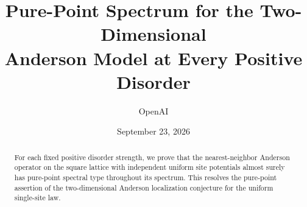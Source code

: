 \documentclass[11pt]{article}
\title{Pure-Point Spectrum for the Two-Dimensional\\Anderson Model at Every Positive Disorder}
\author{OpenAI}
\date{September 23, 2026}
\numberwithin{equation}{section}
\theoremstyle{definition}
\theoremstyle{remark}
\begin{document}
\maketitle
\begin{abstract}
For each fixed positive disorder strength, we prove that the nearest-neighbor
Anderson operator on the square lattice with independent uniform site
potentials almost surely has pure-point spectral type throughout its spectrum.
This resolves the pure-point assertion of the two-dimensional Anderson
localization conjecture for the uniform single-site law.
\end{abstract}












\end{document}
